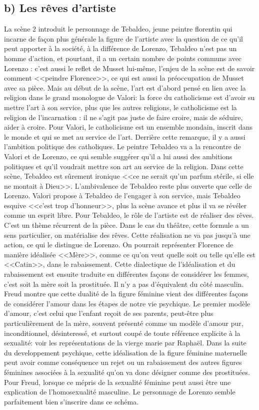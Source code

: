 \documentclass[12pt]{article}
\begin{document}
\subsection*{b) Les rêves d'artiste}
La scène 2 introduit le personnage de Tebaldeo, jeune peintre florentin qui incarne de façon plus générale la figure de l'artiste avec la question de ce qu'il peut apporter à la société, à la différence de Lorenzo, Tebaldeo n'est pas un homme d'action, et pourtant, il a un certain nombre de points communs avec Lorenzo : c'est aussi le reflet de Musset lui-même, l'enjeu de la scène est de savoir comment <<peindre Florence>>, ce qui est aussi la préoccupation de Musset avec sa pièce.
Mais au début de la scène, l'art est d'abord pensé en lien avec la religion dans le grand monologue de Valori: la force du catholicisme est d'avoir su mettre l'art à son service, plus que les autres religions, le catholicisme est la religion de l'incarnation : il ne s'agit pas juste de faire croire, mais de séduire, aider à croire.
Pour Valori, le catholicisme est un ensemble mondain, inscrit dans le monde et qui se met au service de l'art. Derrière cette remarque, il y a aussi l'ambition politique des catholiques.
Le peintre Tebaldeo va a la rencontre de Valori et de Lorenzo, ce qui semble suggérer qu'il a lui aussi des ambitions politiques et qu'il voudrait mettre son art au service de la religion.
Dans cette scène, Tebaldeo est sûrement ironique <<ce ne serait qu'un parfum stérile, si elle ne montait à Dieu>>.
L'ambivalence de Tebaldeo reste plus ouverte que celle de Lorenzo.
Valori propose à Tebaldeo de l'engager à son service, mais Tebaldeo esquive <<c'est trop d'honneur>>, plus la scène avance et plus il va se révéler comme un esprit libre.
Pour Tebaldeo, le rôle de l'artiste est de réaliser des rêves. C'est un thème récurrent de la pièce.
Dans le cas du théâtre, cette formule a un sens particulier, on matérialise des rêves.
Cette réalisation ne va pas jusqu'à une action, ce qui le distingue de Lorenzo.
On pourrait représenter Florence de manière idéalisée <<Mère>>, comme ce qu'on veut quelle soit ou telle qu'elle est <<Catin>>, dans le rabaissement.
Cette dialectique de l'idéalisation et du rabaissement est ensuite traduite en différentes façons de considérer les femmes, c'est soit la mère soit la prostituée.
Il n'y a pas d'équivalent du côté masculin.
Freud montre que cette dualité de la figure féminine vient des différentes façons de considérer l'amour dans les étapes de notre vie psychique. Le premier modèle d'amour, c'est celui que l'enfant reçoit de ses parents, peut-être plus particulièrement de la mère, souvent présenté comme un modèle d'amour pur, inconditionnel, désinteressé, et surtout coupé de toute référence explicite à la sexualité: voir les représentations de la vierge marie par Raphaël.
Dans la suite du developpement psychique, cette idéalisation de la figure féminine maternelle peut avoir comme conséquence un rejet ou un rabaissement des autres figures féminines associées à la sexualité qu'on va donc désigner comme des prostituées.
Pour Freud, lorsque ce mépris de la sexualité féminine peut aussi être une explication de l'homosexualité masculine.
Le personnage de Lorenzo semble parfaitement bien s'inscrire dans ce schéma.
\end{document}
